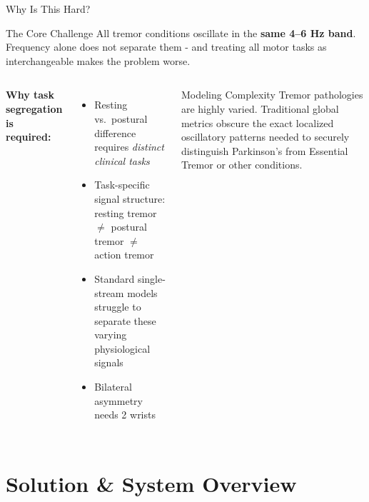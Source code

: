 \documentclass[aspectratio=169, 11pt]{beamer}
\begin{document}
\begin{frame}{Why Is This Hard?}
  \begin{exampleblock}{The Core Challenge}
    \small
    All tremor conditions oscillate in the \textbf{same 4--6 Hz band}.
    Frequency alone does not separate them - and treating all motor
    tasks as interchangeable makes the problem worse.
  \end{exampleblock}

  \vspace{0.4em}
  \begin{columns}[T]
      \small
      \textbf{Why task segregation is required:}
      \begin{itemize}
        \item Resting vs.\ postural difference requires \emph{distinct clinical tasks}
        \item Task-specific signal structure: resting tremor
              $\neq$ postural tremor $\neq$ action tremor
        \item Standard single-stream models struggle to separate
              these varying physiological signals
        \item Bilateral asymmetry \textrightarrow{} needs 2 wrists
      \end{itemize}
      \begin{alertblock}{Modeling Complexity}
        \small
        Tremor pathologies are highly varied. 
        Traditional global metrics obscure the exact localized 
        oscillatory patterns needed to securely distinguish 
        Parkinson's from Essential Tremor or other conditions.
      \end{alertblock}
  \end{columns}
\end{frame}

\section{Solution \& System Overview}
\end{document}
